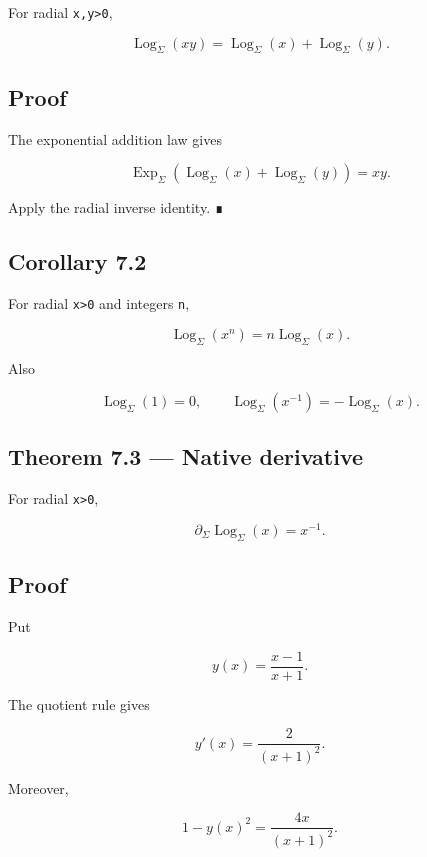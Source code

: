 For radial \texttt{x,y\textgreater{}0},

\[
\boxed{
\operatorname{Log}_\Sigma(xy)
=
\operatorname{Log}_\Sigma(x)
+
\operatorname{Log}_\Sigma(y).
}
\]

\hypertarget{proof-8}{%
\subsection{Proof}\label{proof-8}}

The exponential addition law gives

\[
\operatorname{Exp}_\Sigma
(\operatorname{Log}_\Sigma(x)+
 \operatorname{Log}_\Sigma(y))
=xy.
\]

Apply the radial inverse identity. ∎

\hypertarget{corollary-7.2}{%
\subsection{Corollary 7.2}\label{corollary-7.2}}

For radial \texttt{x\textgreater{}0} and integers \texttt{n},

\[
\operatorname{Log}_\Sigma(x^n)
=n\operatorname{Log}_\Sigma(x).
\]

Also

\[
\operatorname{Log}_\Sigma(1)=0,
\qquad
\operatorname{Log}_\Sigma(x^{-1})
=-\operatorname{Log}_\Sigma(x).
\]

\hypertarget{theorem-7.3-native-derivative}{%
\subsection{Theorem 7.3 --- Native derivative}\label{theorem-7.3-native-derivative}}

For radial \texttt{x\textgreater{}0},

\[
\boxed{
\partial_\Sigma\operatorname{Log}_\Sigma(x)
=x^{-1}.
}
\]

\hypertarget{proof-9}{%
\subsection{Proof}\label{proof-9}}

Put

\[
y(x)=\frac{x-1}{x+1}.
\]

The quotient rule gives

\[
y'(x)=\frac{2}{(x+1)^2}.
\]

Moreover,

\[
1-y(x)^2
=
\frac{4x}{(x+1)^2}.
\]

